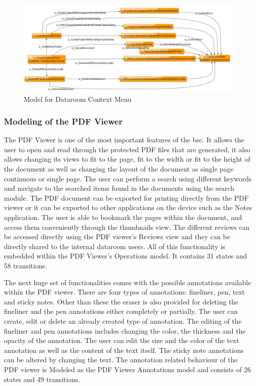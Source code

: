 \begin{figure} [htbp!]
	\centering
					\includegraphics[width=1\textwidth]{figures/Context_Menu_model_screenshot}
					\caption{\label{Fig:Context_Menu_model_screenshot} Model for Dataroom Context Menu}
\end{figure}

\subsubsection{Modeling of the PDF Viewer}
\par
The PDF Viewer is one of the most important features of the \acrshort{bsc}. It allows the user to open and read through the protected PDF files that are generated, it also allows changing its views to fit to the page, fit to the width or fit to the height of the document as well as changing the layout of the document as single page continuous or single page. The user can perform a search using different keywords and navigate to the searched items found in the documents using the search module. The PDF document can be exported for printing directly from the PDF viewer or it can be exported to other applications on the device such as the Notes application. The user is able to bookmark the pages within the document, and access them conveniently through the thumbnails view. The different reviews can be accessed directly using the PDF viewer's Reviews view and they can be directly shared to the internal dataroom users. All of this functionality is embedded within the PDF Viewer's Operations model. It contains 31 states and 58 transitions.

\par
The next huge set of functionalities comes with the possible annotations available within the PDF viewer. There are four types of annotations: fineliner, pen, text and sticky notes. Other than these the eraser is also provided for deleting the fineliner and the pen annotations either completely or partially. The user can create, edit or delete an already created type of annotation. The editing of the fineliner and pen annotations includes changing the color, the thickness and the opacity of the annotation. The user can edit the size and the color of the text annotation as well as the content of the text itself. The sticky note annotations can be altered by changing the text. The annotation related behaviour of the PDF viewer is Modeled as the PDF Viewer Annotations model and consists of 26 states and 49 transitions.

